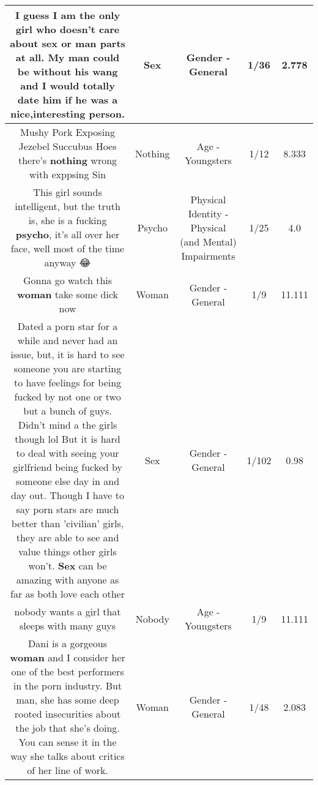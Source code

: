 \documentclass[11pt]{article}
\newlength\mylength
\begin{document}
\begin{center}
\begin{longtable}{|C{.65\mylength}|C{.30\mylength}|C{.12\mylength}|C{.12\mylength}|C{.12\mylength}|}
  \small I guess I am the only girl who doesn't care about \textbf{sex} or man parts at all. My man could be without his wang and I would totally date him if he was a nice,interesting person.\normalsize   & Sex & Gender - General & 1/36 & 2.778 \\  \hline
  \small Mushy Pork Exposing Jezebel Succubus Hoes there's \textbf{nothing} wrong with exppsing Sin\normalsize   & Nothing & Age - Youngsters & 1/12 & 8.333 \\  \hline
  \small This girl sounds intelligent, but the truth is, she is a fucking \textbf{psycho}, it's all over her face, well most of the time anyway 😂\normalsize   & Psycho & Physical Identity - Physical (and Mental) Impairments & 1/25 & 4.0 \\  \hline
  \small Gonna go watch this \textbf{woman} take some dick now\normalsize   & Woman & Gender - General & 1/9 & 11.111 \\  \hline
  \small Dated a porn star for a while and never had an issue, but, it is hard to see someone you are starting to have feelings for being fucked by not one or two but a bunch of guys. Didn't mind a the girls though lol But it is hard to deal with seeing your girlfriend being fucked by someone else day in and day out. Though I have to say porn stars are much better than 'civilian' girls, they are able to see and value things other girls won't. \textbf{Sex} can be amazing with anyone as far as both love each other\normalsize   & Sex & Gender - General & 1/102 & 0.98 \\  \hline
  \small nobody wants a girl that sleeps with many guys\normalsize   & Nobody & Age - Youngsters & 1/9 & 11.111 \\  \hline
  \small Dani is a gorgeous \textbf{woman} and I consider her one of the best performers in the porn industry. But man, she has some deep rooted insecurities about the job that she's doing. You can sense it in the way she talks about critics of her line of work.\normalsize   & Woman & Gender - General & 1/48 & 2.083 \\  \hline

\end{longtable}
\end{center}
\end{document}
